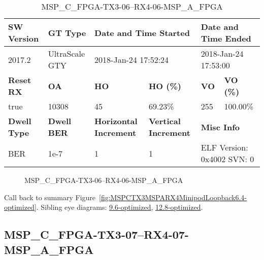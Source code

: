 \begin{table}[h]
\centering
\caption{MSP\_C\_FPGA-TX3-06--RX4-06-MSP\_A\_FPGA}
\label{tab:MSPCFPGATX306RX406MSPAFPGA6.4-optimized}
\begin{tabular}{@{}|l|l|l|l|l|l|@{}}
\toprule
\textbf{SW Version}                & \textbf{GT Type}   & \multicolumn{2}{l|}{\textbf{Date and Time Started}}            & \multicolumn{2}{l|}{\textbf{Date and Time Ended}}        \\ \midrule
2017.2                       & UltraScale GTY          & \multicolumn{2}{l|}{2018-Jan-24 17:52:24}                   & \multicolumn{2}{l|}{2018-Jan-24 17:53:00}               \\ \midrule
\textbf{Reset RX}                  & \textbf{OA} & \textbf{HO}   & \textbf{HO (\%)} & \textbf{VO} & \textbf{VO (\%)} \\ \midrule
true & 10308        & 45          & 69.23\%        & 255        & 100.00\%       \\ \midrule
\textbf{Dwell Type}                & \textbf{Dwell BER} & \textbf{Horizontal Increment} & \textbf{Vertical Increment}    & \multicolumn{2}{l|}{\textbf{Misc Info}}                  \\ \midrule
BER                            & 1e-7        & 1        & 1           & \multicolumn{2}{l|}{ELF Version: 0x4002 SVN: 0}                         \\ \bottomrule
\end{tabular}
\end{table}

\begin{figure}[h]
\caption{MSP\_C\_FPGA-TX3-06--RX4-06-MSP\_A\_FPGA} \label{fig:MSPCFPGATX306RX406MSPAFPGA6.4-optimized}
\end{figure}

Call back to summary Figure~\ref{fig:MSPCTX3MSPARX4MinipodLoopback6.4-optimized}.
Sibling eye diagrams: \hyperref[sec:MSPCFPGATX306RX406MSPAFPGA9.6-optimized]{9.6-optimized}, \hyperref[sec:MSPCFPGATX306RX406MSPAFPGA12.8-optimized]{12.8-optimized}.

\clearpage
\newpage


\subsection{MSP\_C\_FPGA-TX3-07--RX4-07-MSP\_A\_FPGA}\label{sec:MSPCFPGATX307RX407MSPAFPGA6.4-optimized}

